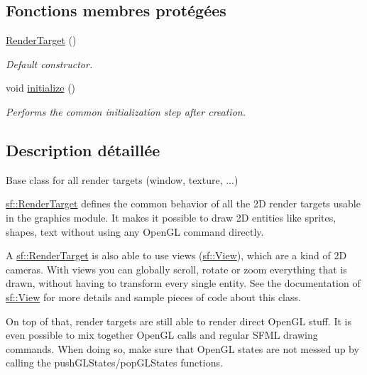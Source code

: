 \subsection*{Fonctions membres protégées}
\begin{DoxyCompactItemize}
\item 
\mbox{\label{classsf_1_1RenderTarget_a2997c96cbd93cb8ce0aba2ddae35b86f}} 
\hyperlink{classsf_1_1RenderTarget_a2997c96cbd93cb8ce0aba2ddae35b86f}{Render\+Target} ()
\begin{DoxyCompactList}\small\item\em Default constructor. \end{DoxyCompactList}\item 
void \hyperlink{classsf_1_1RenderTarget_af530274b34159d644e509b4b4dc43eb7}{initialize} ()
\begin{DoxyCompactList}\small\item\em Performs the common initialization step after creation. \end{DoxyCompactList}\end{DoxyCompactItemize}


\subsection{Description détaillée}
Base class for all render targets (window, texture, ...) 

\hyperlink{classsf_1_1RenderTarget}{sf\+::\+Render\+Target} defines the common behavior of all the 2D render targets usable in the graphics module. It makes it possible to draw 2D entities like sprites, shapes, text without using any Open\+GL command directly.

A \hyperlink{classsf_1_1RenderTarget}{sf\+::\+Render\+Target} is also able to use views (\hyperlink{classsf_1_1View}{sf\+::\+View}), which are a kind of 2D cameras. With views you can globally scroll, rotate or zoom everything that is drawn, without having to transform every single entity. See the documentation of \hyperlink{classsf_1_1View}{sf\+::\+View} for more details and sample pieces of code about this class.

On top of that, render targets are still able to render direct Open\+GL stuff. It is even possible to mix together Open\+GL calls and regular S\+F\+ML drawing commands. When doing so, make sure that Open\+GL states are not messed up by calling the push\+G\+L\+States/pop\+G\+L\+States functions.

